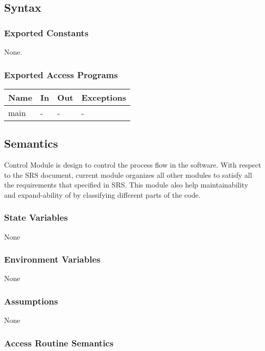 \documentclass[12pt, titlepage]{article}
\begin{document}
\subsection{Syntax}

\subsubsection{Exported Constants}
None.
\subsubsection{Exported Access Programs}

\begin{center}
\begin{tabular}{p{2cm} p{4cm} p{4cm} p{2cm}}
\hline
\textbf{Name} & \textbf{In} & \textbf{Out} & \textbf{Exceptions} \\
\hline
main & - & - & - \\
\hline
\end{tabular}
\end{center}

\subsection{Semantics}
\progname{} Control Module is design to control the process flow in the software. With respect to the SRS document, current module organizes all other modules to satisfy all the requirements that specified in SRS. This module also help maintainability and expand-ability of \progname{} by classifying different parts of the code.

\subsubsection{State Variables}

None

\subsubsection{Environment Variables}

None

\subsubsection{Assumptions}

None
 
\subsubsection{Access Routine Semantics}
\end{document}
